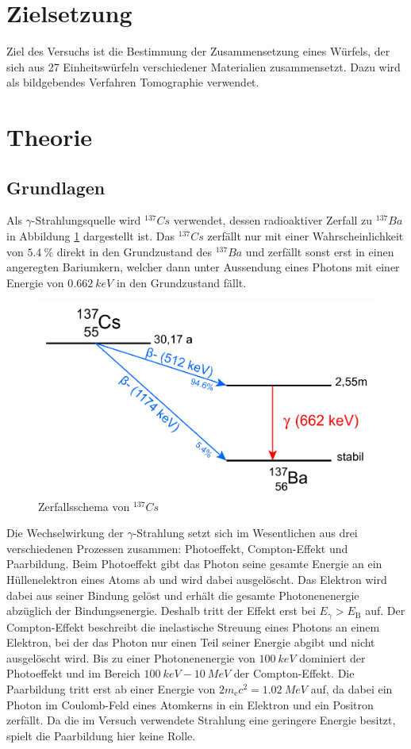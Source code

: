 \section{Zielsetzung}
Ziel des Versuchs ist die Bestimmung der Zusammensetzung eines Würfels, der sich aus 27 Einheitswürfeln verschiedener Materialien zusammensetzt.
Dazu wird als bildgebendes Verfahren Tomographie verwendet.


\section{Theorie}
\subsection{Grundlagen}
Als $\gamma$-Strahlungsquelle wird ${}^{137}Cs$ verwendet, dessen radioaktiver Zerfall zu ${}^{137}Ba$ in Abbildung \ref{fig:zerfall} dargestellt ist.
Das ${}^{137}Cs$ zerfällt nur mit einer Wahrscheinlichkeit von $\SI{5.4}{\%}$ direkt in den Grundzustand des ${}^{137}Ba$ und zerfällt sonst erst
in einen angeregten Bariumkern, welcher dann unter Aussendung eines Photons mit einer Energie von $\SI{0.662}{keV}$ in den Grundzustand fällt.

\begin{figure}
  \centering
  \includegraphics[scale=0.4]{graphics/Zerfall.png}
  \caption{Zerfallsschema von ${}^{137}Cs$}
  \label{fig:zerfall}
\end{figure}

Die Wechselwirkung der $\gamma$-Strahlung setzt sich im Wesentlichen aus drei verschiedenen Prozessen zusammen: Photoeffekt, Compton-Effekt und Paarbildung.
Beim Photoeffekt gibt das Photon seine gesamte Energie an ein Hüllenelektron eines Atoms ab und wird dabei ausgelöscht. Das Elektron wird dabei aus seiner
Bindung gelöst und erhält die gesamte Photonenenergie abzüglich der Bindungsenergie. Deshalb tritt der Effekt erst bei $E_\gamma > E_\text{B}$ auf.
Der Compton-Effekt beschreibt die inelastische Streuung eines Photons an einem Elektron, bei der das Photon nur einen Teil seiner Energie abgibt und nicht
ausgelöscht wird. Bis zu einer Photonenenergie von $\SI{100}{keV}$ dominiert der Photoeffekt und im Bereich $\SI{100}{keV} - \SI{10}{MeV}$ der
Compton-Effekt. Die Paarbildung tritt erst ab einer Energie von $2m_\text{e}c^2 = \SI{1.02}{MeV}$ auf, da dabei ein Photon im Coulomb-Feld eines Atomkerns
in ein Elektron und ein Positron zerfällt. Da die im Versuch verwendete Strahlung eine geringere Energie besitzt, spielt die Paarbildung hier keine Rolle.

